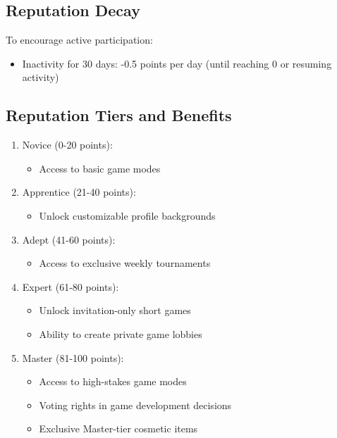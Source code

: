 \documentclass[12pt,a4paper]{article}
\begin{document}
\subsection{Reputation Decay}
To encourage active participation:
\begin{itemize}
    \item Inactivity for 30 days: -0.5 points per day (until reaching 0 or resuming activity)
\end{itemize}

\subsection{Reputation Tiers and Benefits}
\begin{enumerate}
    \item Novice (0-20 points):
    \begin{itemize}
        \item Access to basic game modes
    \end{itemize}
    \item Apprentice (21-40 points):
    \begin{itemize}
        \item Unlock customizable profile backgrounds
    \end{itemize}
    \item Adept (41-60 points):
    \begin{itemize}
        \item Access to exclusive weekly tournaments
    \end{itemize}
    \item Expert (61-80 points):
    \begin{itemize}
        \item Unlock invitation-only short games
        \item Ability to create private game lobbies
    \end{itemize}
    \item Master (81-100 points):
    \begin{itemize}
        \item Access to high-stakes game modes
        \item Voting rights in game development decisions
        \item Exclusive Master-tier cosmetic items
    \end{itemize}
\end{enumerate}
\end{document}
